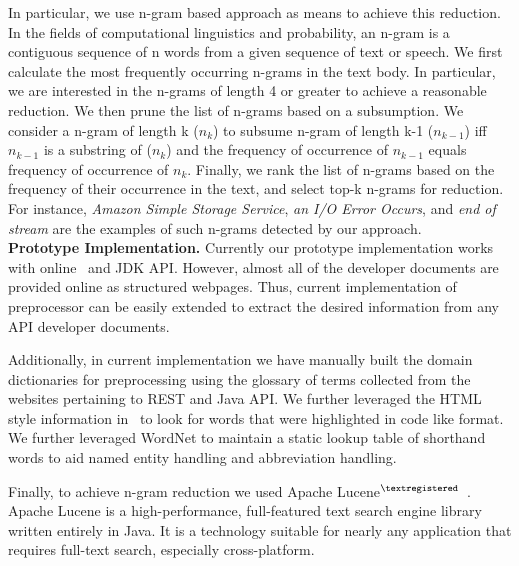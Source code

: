 In particular, we use n-gram based approach as means to achieve this reduction. 
In the fields of computational linguistics and probability, an n-gram is a contiguous sequence of n words from a given sequence of text or speech. 
We first calculate the most frequently occurring n-grams in the text body. 
In particular, we are interested in the n-grams of length 4 or greater to achieve a reasonable reduction. 
We then prune the list of n-grams based on a subsumption. 
We consider a n-gram of length k ($n_k$) to subsume n-gram of length k-1 ($n_{k-1}$) iff $n_{k-1}$ is a substring of ($n_k$) and the frequency of occurrence of $n_{k-1}$ equals frequency of occurrence of $n_{k}$.
Finally, we rank the list of n-grams based on the frequency of their occurrence in the text, and select top-k n-grams for reduction.
For instance, \textit{Amazon Simple Storage Service}, \textit{an I/O Error Occurs}, and \textit{end of stream} are the examples of such n-grams detected by our approach.
\\
\textbf{Prototype Implementation.}
Currently our prototype implementation works with online \amazon\ and JDK API. 
However, almost all of the developer documents are provided online as structured webpages.
Thus, current implementation of preprocessor can be easily extended to extract the desired information from any API developer documents.    

Additionally, in current implementation we have manually built the domain dictionaries for preprocessing using the glossary of terms collected from the websites pertaining to REST and Java API.
We further leveraged the HTML style information in \amazon\ to look for words that were highlighted in code like format. We further leveraged WordNet to maintain a static lookup table of shorthand words to aid named entity handling and abbreviation handling. 

 
Finally, to achieve  n-gram reduction we used Apache Lucene$^{\textregistered}$~\cite{lucene}.
Apache Lucene is a high-performance, full-featured text search engine library written entirely in Java.
It is a technology suitable for nearly any application that requires full-text search, especially cross-platform.

